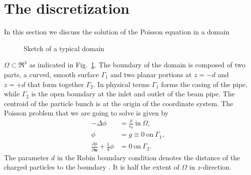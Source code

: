 \section{The discretization}
\label{sec:discr}

In this section we discuss the solution of the Poisson equation in a
domain 
\begin{figure}[htb]
  \centering
  
  \caption{Sketch of a typical domain}
  \label{fig:domain}
\end{figure}
$\Omega \subset \Re^3$ as indicated in Fig.~\ref{fig:domain}.  The
boundary of the domain is composed of two parts, a curved, smooth
surface $\Gamma_1$ and two planar portions at $z=-d$ and $z=+d$ that
form together $\Gamma_2$.  In physical terms $\Gamma_1$ forms the casing
of the pipe, while $\Gamma_2$ is the open boundary at the inlet and
outlet of the beam pipe.  The centroid of the particle bunch is at the
origin of the coordinate system.  The Poisson problem that we are going
to solve is given by
\begin{equation} \label{eq:poisson}
  \begin{aligned}
    -\Delta \phi &= \frac{\rho}{\epsilon_0}\ \text{in}\ \Omega, \\
    \phi &= g \equiv 0\ \text{on}\ \Gamma_1,   \\
    \frac{\partial \phi}{\partial \mathbf{n}} + \frac {1}{d} \phi &= 0\
    \text{on}\ \Gamma_2.
  \end{aligned}
\end{equation}
The parameter $d$ in the Robin boundary condition denotes the distance
of the charged particles to the boundary \cite{poplau_self-adaptive_2008}.  It is half the extent of
$\Omega$ in $z$-direction. 

